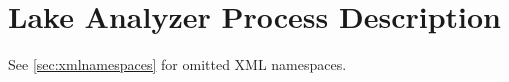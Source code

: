 
\chapter{Lake Analyzer Process Description}
\label{appendix:lakeanalyzer:description}

See \cref{sec:xmlnamespaces} for omitted XML namespaces.

